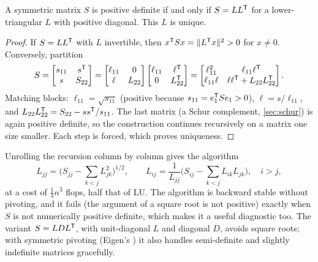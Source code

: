 \begin{theorem}
\label{thm:cholesky}
A symmetric matrix $S$ is positive definite if and only if $S = LL^{\mathsf{T}}$ for a lower-triangular $L$ with positive diagonal.
This $L$ is unique.
\end{theorem}
\begin{proof}
If $S = LL^{\mathsf{T}}$ with $L$ invertible, then $x^{\mathsf{T}} Sx = \|L^{\mathsf{T}} x\|^2 > 0$ for $x \ne 0$. Conversely, partition
\begin{equation*}
  S = \begin{bmatrix} s_{11} & s^{\mathsf{T}} \\ s & S_{22} \end{bmatrix}
    = \begin{bmatrix} \ell_{11} & 0 \\ \ell & L_{22} \end{bmatrix}\begin{bmatrix} \ell_{11} & \ell^{\mathsf{T}} \\ 0 & L_{22}^{\mathsf{T}} \end{bmatrix}
    = \begin{bmatrix} \ell_{11}^2 & \ell_{11}\ell^{\mathsf{T}} \\ \ell_{11}\ell & \ell\ell^{\mathsf{T}} + L_{22}L_{22}^{\mathsf{T}} \end{bmatrix}.
\end{equation*}
Matching blocks: $\ell_{11} = \sqrt{s_{11}}$ (positive because $s_{11} = e_1^{\mathsf{T}} Se_1 > 0$), $\ell = s/\ell_{11}$, and
$L_{22}L_{22}^{\mathsf{T}} = S_{22} - ss^{\mathsf{T}}/s_{11}$. The last matrix (a Schur complement, \cref{sec:schur}) is again positive definite, so the
construction continues recursively on a matrix one size smaller. Each step is forced, which proves uniqueness.
\end{proof}

Unrolling the recursion column by column gives the algorithm
\begin{equation}
  L_{jj} = \Big( S_{jj} - \sum_{k<j} L_{jk}^2 \Big)^{1/2}, \qquad
  L_{ij} = \frac{1}{L_{jj}}\Big( S_{ij} - \sum_{k<j} L_{ik}L_{jk} \Big), \quad i > j,
\end{equation}
at a cost of $\tfrac13n^3$ flops, half that of LU. The algorithm is backward stable without pivoting, and it fails (the argument
of a square root is not positive) exactly when $S$ is not numerically positive definite, which makes it a useful diagnostic
too. The variant $S = LDL^{\mathsf{T}}$, with unit-diagonal $L$ and diagonal $D$, avoids square roots; with symmetric pivoting (Eigen's
) it also handles semi-definite and slightly indefinite matrices gracefully.


